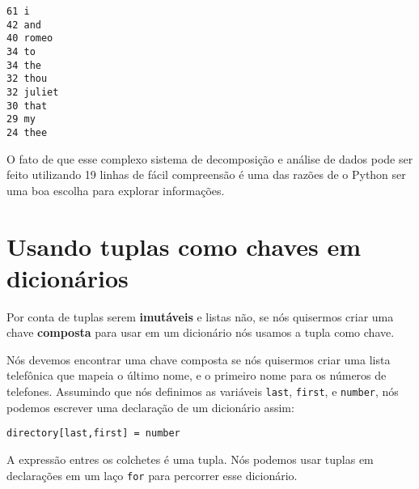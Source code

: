 \beforeverb
\begin{verbatim}
61 i
42 and
40 romeo
34 to
34 the
32 thou
32 juliet
30 that
29 my
24 thee
\end{verbatim}
\afterverb
%
O fato de que esse complexo sistema de decomposição e análise de dados pode
ser feito utilizando 19 linhas de fácil compreensão é uma das razões de o
Python ser uma boa escolha para explorar informações.

\section{Usando tuplas como chaves em dicionários}


Por conta de tuplas serem {\bf imutáveis} e listas não, se nós quisermos criar
uma chave {\bf composta} para usar em um dicionário nós usamos a tupla como
chave.

Nós devemos encontrar uma chave composta se nós quisermos criar uma lista
telefônica que mapeia o último nome, e o primeiro nome para os números
de telefones. Assumindo que nós definimos as variáveis {\tt last},
{\tt first}, e {\tt number}, nós podemos escrever uma declaração de um
dicionário assim:

\beforeverb
\begin{verbatim}
directory[last,first] = number
\end{verbatim}
\afterverb
%
A expressão entres os colchetes é uma tupla. Nós podemos usar tuplas em
declarações em um laço {\tt for} para percorrer esse dicionário.


